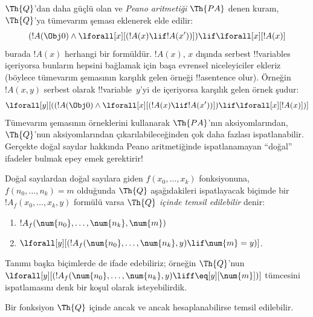 $\Th{Q}$'dan daha güçlü olan ve \emph{Peano aritmetiği} $\Th{PA}$ denen
kuram, $\Th{Q}$'ya tümevarım şeması eklenerek elde edilir:
\[
(!A(\Obj 0) \land \lforall[x][(!A(x) \lif !A(x'))]) \lif \lforall[x][!A(x)]
\]
burada $!A(x)$ herhangi bir formüldür. $!A(x)$, $x$ dışında serbest
!!{variable}s içeriyorsa bunların hepsini bağlamak için başa evrensel
niceleyiciler ekleriz (böylece tümevarım şemasının karşılık gelen örneği
!!a{sentence} olur). Örneğin $!A(x,y)$ serbest olarak !!{variable}~$y$'yi
de içeriyorsa karşılık gelen örnek şudur:
\[
\lforall[y][((!A(\Obj 0) \land \lforall[x][(!A(x) \lif !A(x'))]) \lif
  \lforall[x][!A(x)])]
\]
Tümevarım şemasının örneklerini kullanarak $\Th{PA}$'nın aksiyomlarından,
$\Th{Q}$'nun aksiyomlarından çıkarılabileceğinden çok daha fazlası
ispatlanabilir. Gerçekte doğal sayılar hakkında Peano aritmetiğinde
ispatlanamayan ``doğal'' ifadeler bulmak epey emek gerektirir!{}

\begin{defn}
  Doğal sayılardan doğal sayılara giden $f(x_0,\ldots,x_k)$ fonksiyonuna,
  $f(n_0,\dots,n_k)=m$ olduğunda $\Th{Q}$ aşağıdakileri ispatlayacak
  biçimde bir $!A_f(x_0,\dots,x_k,y)$ formülü varsa
  {\em $\Th{Q}$ içinde temsil edilebilir} denir:
\begin{enumerate}
\item{} $!A_f(\num{n_0}, \dots, \num{n_k}, \num{m})$
\item{} $\lforall[y][(!A_f(\num{n_0}, \dots,
\num{n_k}, y) \lif \num{m} = y)]$.
\end{enumerate}
\end{defn}

Tanımı başka biçimlerde de ifade edebiliriz; örneğin $\Th{Q}$'nun
$\lforall[y][(!A_f(\num{n_0}, \dots, \num{n_k}, y) \liff
\eq[y][\num{m}])]$ tümcesini ispatlamasını denk bir koşul olarak
isteyebilirdik.

\begin{thm}
Bir fonksiyon $\Th{Q}$ içinde ancak ve ancak hesaplanabilirse temsil
edilebilir.
\end{thm}

